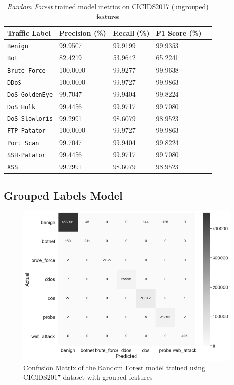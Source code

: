 \begin{table}[h!]
   \centering
   \begin{tabular}{l|llll}
       \toprule 
       Traffic Label & Precision (\%) & Recall (\%) & F1 Score (\%) \\
       \midrule
       \rowcolor{black!10} \texttt{Benign} & 99.9507 & 99.9199 & 99.9353 \\
       \texttt{Bot} & 82.4219 & 53.9642 & 65.2241 \\
       \rowcolor{black!10} \texttt{Brute Force} & 100.0000 & 99.9277 & 99.9638 \\
       \texttt{DDoS} & 100.0000 & 99.9727 & 99.9863 \\
       \rowcolor{black!10} \texttt{DoS GoldenEye} & 99.7047 & 99.9404 & 99.8224 \\
       \texttt{DoS Hulk} & 99.4456 & 99.9717 & 99.7080 \\
       \rowcolor{black!10} \texttt{DoS Slowloris} & 99.2991 & 98.6079 & 98.9523 \\
       \texttt{FTP-Patator} & 100.0000 & 99.9727 & 99.9863 \\
       \rowcolor{black!10} \texttt{Port Scan} & 99.7047 & 99.9404 & 99.8224 \\
       \texttt{SSH-Patator} & 99.4456 & 99.9717 & 99.7080 \\
       \rowcolor{black!10} \texttt{XSS} & 99.2991 & 98.6079 & 98.9523 \\
       \bottomrule
   \end{tabular}
   \caption{\textit{Random Forest} trained model metrics on CICIDS2017 (ungrouped) features}
   \label{tab:ungrouped-metrics}
\end{table}

\subsection{Grouped Labels Model}
\label{subsec:grouped-training}

\begin{figure}[h!]
   \centering
   \includegraphics[scale=0.52]{assets/figures/chapter3/grouped_confusion_matrix.png}
   \caption{Confusion Matrix of the Random Forest model trained using CICIDS2017 dataset with grouped features}
   \label{fig:grouped-confusion-matrix}
\end{figure}

